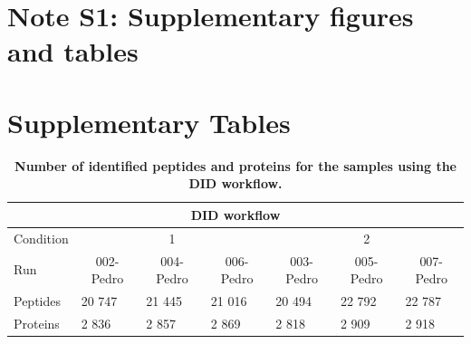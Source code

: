 \documentclass[11pt]{article}
\begin{document}
\maketitle

\section*{Note S1: Supplementary figures and tables}
\label{sec:fc-eval}

\section*{Supplementary Tables}

\begin{table}[h]
    \begin{tabular}{lllllll}
    \hline
    \multicolumn{7}{c}{DID workflow}                                                                                                                                                                                   \\ \hline
    Condition & \multicolumn{3}{c}{1}                                                                         & \multicolumn{3}{c}{2}                                                                         \\
    Run       & \multicolumn{1}{c}{002-Pedro} & \multicolumn{1}{c}{004-Pedro} & \multicolumn{1}{c}{006-Pedro} & \multicolumn{1}{c}{003-Pedro} & \multicolumn{1}{c}{005-Pedro} & \multicolumn{1}{c}{007-Pedro} \\
    Peptides  & 20 747                        & 21 445                        & 21 016                        & 20 494                        & 22 792                        & 22 787                        \\
    Proteins  & 2 836                         & 2 857                         & 2 869                         & 2 818                         & 2 909                         & 2 918                         \\ \hline
    \end{tabular}
     \caption{{\bf Number of identified peptides and proteins for the samples using the DID workflow.}
          \label{fig:osw_peptide_and_protein_id}}
\end{table}
        
\end{document}
